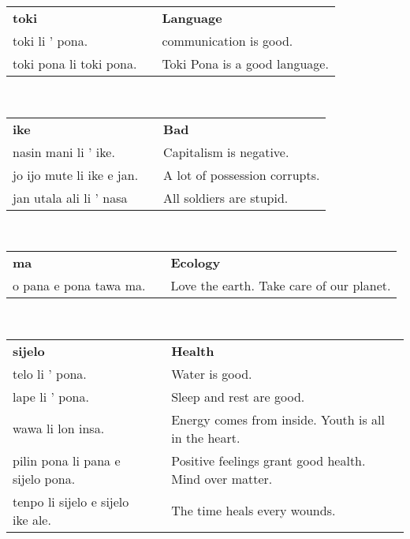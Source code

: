 %
\begin{supertabular}{p{6cm}|ll}
\textbf{toki} && \textbf{Language} \\
toki li ' pona.  && communication is good.  \\
toki pona li toki pona.  && Toki Pona is a good language.  \\
\end{supertabular} \\
%
\begin{supertabular}{p{6cm}|ll}
\textbf{ike} && \textbf{Bad} \\
nasin mani li ' ike.  && Capitalism is negative.  \\
jo ijo mute li ike e jan.  && A lot of possession corrupts.  \\
jan utala ali li ' nasa && All soldiers are stupid. \\
\end{supertabular} \\
%
\begin{supertabular}{p{6cm}|ll}
\textbf{ma} && \textbf{Ecology} \\
o pana e pona tawa ma.  && Love the earth. Take care of our planet.  \\ 
\end{supertabular} \\
%
\begin{supertabular}{p{6cm}|ll}
\textbf{sijelo} && \textbf{Health} \\
telo li ' pona.  && Water is good.  \\
lape li ' pona.  && Sleep and rest are good.  \\
wawa li lon insa.  && Energy comes from inside. Youth is all in the heart. \\ 
pilin pona li pana e sijelo pona. && Positive feelings grant good health. Mind over matter.  \\ 
tenpo li sijelo e sijelo ike ale. && The time heals every wounds. \\
\end{supertabular} \\
%
%
